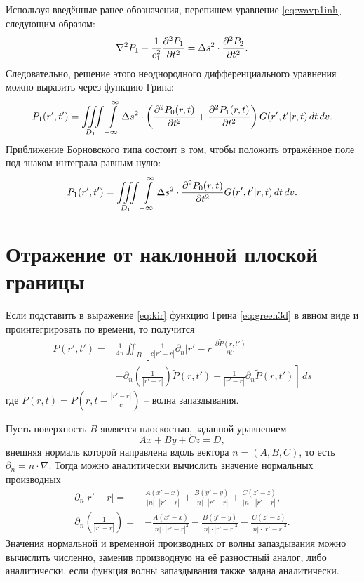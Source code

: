 \documentclass[a4paper, fontsize=14pt]{article}
\begin{document}
	Используя введённые ранее обозначения, перепишем уравнение \ref{eq:wavp1inh} следующим образом:
	\begin{equation}
		\nabla^2 P_1 - \frac{1}{c_1^2}\diff[2]{P_1}{t}  = \Delta s^2 \cdot \diff[2]{P_2}{t}.
	\end{equation}
	Следовательно, решение этого неоднородного дифференциального уравнения можно выразить через функцию Грина:
	\begin{equation}
		P_1(r',t')   = \iiint\limits_{D_1} \int\limits_{-\infty}^{\infty} \Delta s^2 \cdot \left(\diff[2]{P_0(r,t)}{t}+\diff[2]{P_1(r,t)}{t}\right) G(r',t'|r,t)\, dt \, dv.
	\end{equation}
	Приближение Борновского типа состоит в том, чтобы положить отражённое поле под знаком интеграла равным нулю:
	\begin{equation}
		P_1(r',t')   = \iiint\limits_{D_1} \int\limits_{-\infty}^{\infty} \Delta s^2 \cdot \diff[2]{P_0(r,t)}{t} G(r',t'|r,t)\, dt \, dv.
	\end{equation}
	
	\section{Отражение от наклонной плоской границы}
		Если подставить в выражение \ref{eq:kir} функцию Грина \ref{eq:green3d} в явном виде и проинтегрировать по времени, то получится \cite{magisters}
	\begin{align}
		P(r',t') =& \frac{1}{4\pi} \iint_B	\left[ \frac{1}{c|r'-r|}\partial_n|r'-r|\frac{\partial \tilde{P}(r,t')}{\partial t'} \right.\nonumber \\
		&\left. - \partial_n
		\left(\frac{1}{|r'-r|}\right)\tilde{P}(r,t') +\frac{1}{|r'-r|}\partial_n \tilde{P}(r,t')\right]\,ds
		\label{eq:kirgreen3d}
	\end{align}
	где $\tilde{P}(r,t) = P\left(r,t - \frac{|r'-r|}{c}\right)$ -- волна запаздывания.
	
		Пусть поверхность $B$ является плоскостью, заданной уравнением 
		$$
			Ax+By+Cz=D,
		$$ внешняя нормаль которой направлена вдоль вектора $n =(A,B,C)$, то есть $\partial_n = n \cdot \nabla$. Тогда можно аналитически вычислить значение нормальных производных
		\begin{eqnarray}
			\partial_n|r'-r| =&\frac{A(x' - x)}{|n|\cdot|r' - r|}+\frac{B(y' - y)}{|n|\cdot |r' - r|} + \frac{C(z' - z)}{|n|\cdot|r' - r|}, \\ 
			\partial_n\left(\frac{1}{|r'-r|}\right) =&  - \frac{A(x' - x)}{|n|\cdot|r' - r|^3}-\frac{B(y' - y)}{|n|\cdot |r' - r|^3} - \frac{C(z' - z)}{|n|\cdot|r' - r|^3}.
		\end{eqnarray} 
		Значения нормальной и временной производных от волны запаздывания можно вычислить численно, заменив производную на её разностный аналог, либо аналитически, если функция волны запаздывания также задана аналитически.
		
\end{document}
